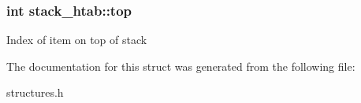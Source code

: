 \subsubsection[{\texorpdfstring{top}{top}}]{\setlength{\rightskip}{0pt plus 5cm}int stack\+\_\+htab\+::top}\hypertarget{structstack__htab_a1bb9f9cb590d2082d0b202f0be999a74}{}\label{structstack__htab_a1bb9f9cb590d2082d0b202f0be999a74}
Index of item on top of stack 

The documentation for this struct was generated from the following file\+:\begin{DoxyCompactItemize}
\item 
structures.\+h\end{DoxyCompactItemize}
